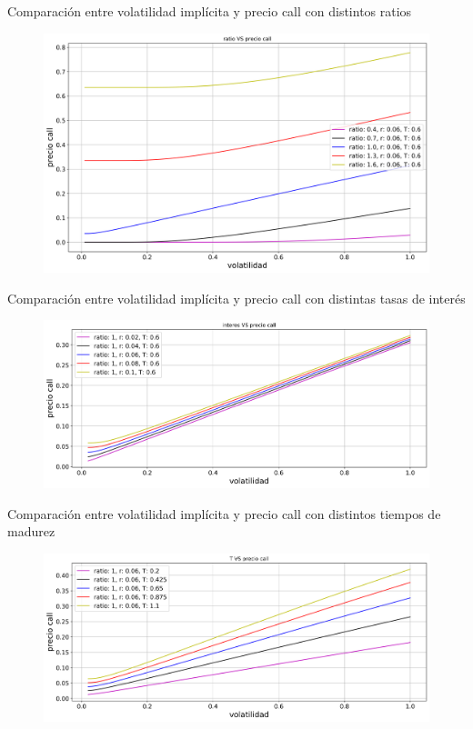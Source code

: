 \documentclass{beamer}
\begin{document}
\begin{frame}{Comparaci\'on entre volatilidad impl\'icita y precio call con distintos ratios}

  \begin{figure}[t!]
    \centering
    \includegraphics[width=11cm%
    ]{imagenes/ratio_v_call}
    
  \end{figure}

\end{frame}

\begin{frame}{Comparaci\'on entre volatilidad impl\'icita y precio call con distintas tasas de inter\'es}

  \begin{figure}[t!]
    \centering
    \includegraphics[width=11cm%
    ]{imagenes/interes_v_call}
  \end{figure}

\end{frame}



\begin{frame}{Comparaci\'on entre volatilidad impl\'icita y precio call con distintos tiempos de madurez}

  \begin{figure}[t!]
    \centering
    \includegraphics[width=11cm%
    ]{imagenes/T_v_call}
  \end{figure}
\end{frame}
\end{document}
